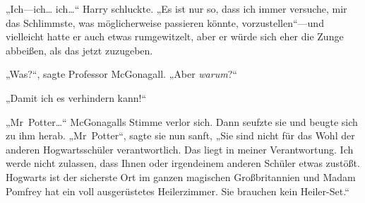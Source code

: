 
„Ich—ich… ich…“ Harry schluckte. „Es ist nur so, dass ich immer versuche, mir das Schlimmste, was möglicherweise passieren könnte, vorzustellen“—und vielleicht hatte er auch etwas rumgewitzelt, aber er würde sich eher die Zunge abbeißen, als das jetzt zuzugeben.

„Was?“, sagte Professor McGonagall. „Aber \emph{warum}?“

„Damit ich es verhindern kann!“

„Mr~Potter…“ McGonagalls Stimme verlor sich. Dann seufzte sie und beugte sich zu ihm herab. „Mr~Potter“, sagte sie nun sanft, „Sie sind nicht für das Wohl der anderen Hogwartsschüler verantwortlich. Das liegt in meiner Verantwortung. Ich werde nicht zulassen, dass Ihnen oder irgendeinem anderen Schüler etwas zustößt. Hogwarts ist der sicherste Ort im ganzen magischen Großbritannien und Madam Pomfrey hat ein voll ausgerüstetes Heilerzimmer. Sie brauchen kein Heiler-Set.“

